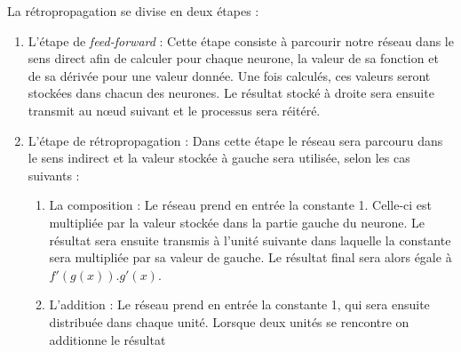 \documentclass{article}
\begin{document}
La rétropropagation se divise en deux étapes :
\begin{enumerate}
\item L'étape de \textit{feed-forward} : Cette étape consiste à parcourir notre réseau dans le sens direct afin de calculer pour chaque neurone, la valeur de sa fonction et de sa dérivée pour une valeur donnée. Une fois calculés, ces valeurs seront stockées dans chacun des neurones. Le résultat stocké à droite sera ensuite transmit au nœud suivant et le processus sera réitéré. %
\item L'étape de rétropropagation : Dans cette étape le réseau sera parcouru dans le sens indirect et la valeur stockée à gauche sera utilisée, selon les cas suivants :
\begin{enumerate}
\item La composition  : Le réseau prend en entrée la constante 1. Celle-ci est multipliée par la valeur stockée dans la partie gauche du neurone. Le résultat sera ensuite transmis à l'unité suivante dans laquelle la constante sera multipliée par sa valeur de gauche. Le résultat final sera alors égale à $f'(g(x)).g'(x)$.
\vfill
\begin{center}
\end{center}
\vfill
\item L'addition : Le réseau prend en entrée la constante 1, qui sera ensuite distribuée dans chaque unité. Lorsque deux unités se rencontre on additionne le résultat 

\end{enumerate}
\end{enumerate}
\end{document}
